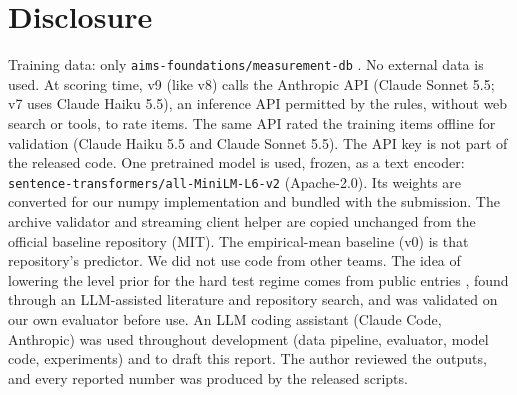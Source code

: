 \documentclass{article}
\begin{document}
\section{Disclosure}

Training data: only \texttt{aims-foundations/measurement-db} \citep{measurementdb}. No external data
is used. At scoring time, v9 (like v8) calls the Anthropic API (Claude Sonnet 5.5; v7 uses Claude Haiku 5.5),
an inference API permitted by the rules, without web search or tools, to rate items. The same API
rated the training items offline for validation (Claude Haiku 5.5 and Claude Sonnet 5.5). The API
key is not part of the released code. One pretrained model is used, frozen, as a text encoder:
\texttt{sentence-transformers/all-MiniLM-L6-v2} \citep{reimers2019,wang2020minilm} (Apache-2.0).
Its weights are converted for our numpy implementation and bundled with the submission. The archive validator and
streaming client helper are copied unchanged from the official baseline repository
\citep{paiec_baselines} (MIT). The empirical-mean baseline (v0) is that repository's predictor. We
did not use code from other teams. The idea of lowering the level prior for the hard
test regime comes from public entries \citep{gpirt,paiksca,doctawho}, found through an LLM-assisted
literature and repository search, and was validated on our own evaluator before use. An LLM coding assistant (Claude Code, Anthropic) was used
throughout development (data pipeline, evaluator, model code, experiments) and to draft this report.
The author reviewed the outputs, and every reported number was produced by the released scripts.
\end{document}
